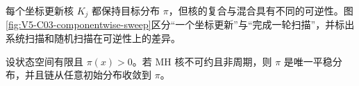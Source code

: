 \documentclass[UTF8,a4paper,11pt,openany]{ctexbook}
\begin{document}
\setcounter{page}{769}
\setcounter{chapter}{32}
\setcounter{figure}{6}
\pagestyle{headings}
每个坐标更新核 $K_j$ 都保持目标分布 $\pi$，但核的复合与混合具有不同的可逆性。图\ref{fig:V5-C03-componentwise-sweep}区分“一个坐标更新”与“完成一轮扫描”，并标出系统扫描和随机扫描在可逆性上的差异。

\begin{theorem}
设状态空间有限且 $\pi(x)>0$。若 MH 核不可约且非周期，则 $\pi$ 是唯一平稳分布，并且链从任意初始分布收敛到 $\pi$。
\end{theorem}
\end{document}
